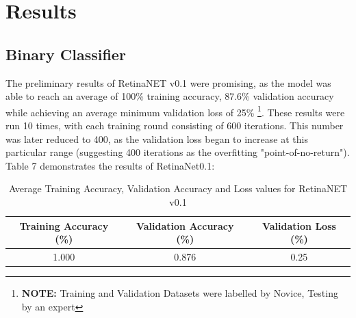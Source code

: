 \documentclass[a4paper]{article}
\begin{document}
\pagebreak

\section{Results}
\subsection{Binary Classifier}
    The preliminary results of RetinaNET v0.1 were promising, as the model was able to reach an average of 100\% training accuracy, 87.6\% validation accuracy while achieving an average minimum validation loss of 25\% \footnote{\textbf{NOTE:} Training and Validation Datasets were labelled by Novice, Testing by an expert}. These results were run 10 times, with each training round consisting of 600 iterations. This number was later reduced to 400, as the validation loss began to increase at this particular range (suggesting 400 iterations as the overfitting "point-of-no-return"). Table 7 demonstrates the results of RetinaNet0.1:

    \begin{table}[!h]
        \centering
            \begin{tabular}{||c c c||} 
            \hline
            \textbf{Training Accuracy (\%)} & \textbf{Validation Accuracy (\%)} & \textbf{Validation Loss (\%)} \\
            \hline\hline
            1.000 & 0.876  & 0.25 \\
            \hline
            \end{tabular}
        \caption{\label{fig:4} Average Training Accuracy, Validation Accuracy and Loss values for RetinaNET v0.1}
    \end{table}
\end{document}
